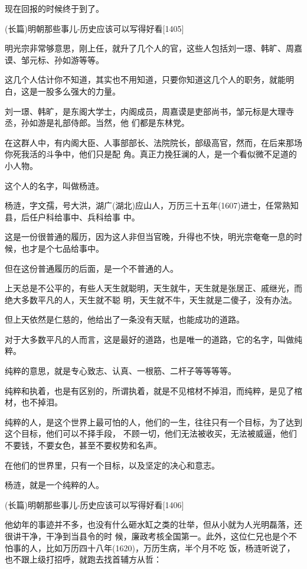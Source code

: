 \documentclass[11pt,a4paper,onecolumn]{article}
\begin{document}
现在回报的时候终于到了。

(长篇)明朝那些事儿-历史应该可以写得好看$[$1405$]$

明光宗非常够意思，刚上任，就升了几个人的官，这些人包括刘一璟、韩旷、周嘉谟、邹元标、孙如游等等。

这几个人估计你不知道，其实也不用知道，只要你知道这几个人的职务，就能明白，这是一股多么强大的力量。

刘一璟、韩旷，是东阁大学士，内阁成员，周嘉谟是吏部尚书，邹元标是大理寺丞，孙如游是礼部侍郎。当然，他
们都是东林党。

在这群人中，有内阁大臣、人事部部长、法院院长，部级高官，然而，在后来那场你死我活的斗争中，他们只是配
角。真正力挽狂澜的人，是一个看似微不足道的小人物。

这个人的名字，叫做杨涟。

杨涟，字文孺，号大洪，湖广(湖北)应山人，万历三十五年(1607)进士，任常熟知县，后任户科给事中、兵科给事
中。

这是一份很普通的履历，因为这人非但当官晚，升得也不快，明光宗奄奄一息的时候，也才是个七品给事中。

但在这份普通履历的后面，是一个不普通的人。

上天总是不公平的，有些人天生就聪明，天生就牛，天生就是张居正、戚继光，而绝大多数平凡的人，天生就不聪
明，天生就不牛，天生就是二傻子，没有办法。

但上天依然是仁慈的，他给出了一条没有天赋，也能成功的道路。

对于大多数平凡的人而言，这是最好的道路，也是唯一的道路，它的名字，叫做纯粹。

纯粹的意思，就是专心致志、认真、一根筋、二杆子等等等等。

纯粹和执着，也是有区别的，所谓执着，就是不见棺材不掉泪，而纯粹，是见了棺材，也不掉泪。

纯粹的人，是这个世界上最可怕的人，他们的一生，往往只有一个目标，为了达到这个目标，他们可以不择手段，
不顾一切，他们无法被收买，无法被威逼，他们不要钱，不要女色，甚至不要权势和名声。

在他们的世界里，只有一个目标，以及坚定的决心和意志。

杨涟，就是一个纯粹的人。

(长篇)明朝那些事儿-历史应该可以写得好看$[$1406$]$

他幼年的事迹并不多，也没有什么砸水缸之类的壮举，但从小就为人光明磊落，还很讲干净，干净到当县令的时
候，廉政考核全国第一。此外，这位仁兄也是个不怕事的人，比如万历四十八年(1620)，万历生病，半个月不吃
饭，杨涟听说了，也不跟上级打招呼，就跑去找首辅方从哲：
\end{document}
